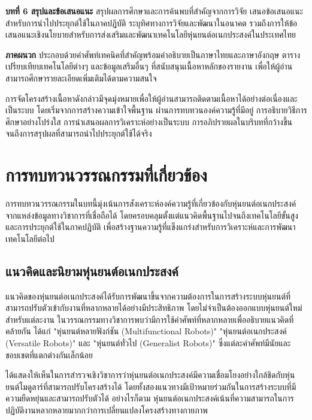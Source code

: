 \documentclass[a4paper]{article}
\begin{document}
\textbf{บทที่ 6 สรุปและข้อเสนอแนะ} สรุปผลการศึกษาและการค้นพบที่สำคัญจากการวิจัย เสนอข้อเสนอแนะสำหรับการนำไปประยุกต์ใช้ในภาคปฏิบัติ ระบุทิศทางการวิจัยและพัฒนาในอนาคต รวมถึงการให้ข้อเสนอแนะเชิงนโยบายสำหรับการส่งเสริมและพัฒนาเทคโนโลยีหุ่นยนต์อเนกประสงค์ในประเทศไทย

\textbf{ภาคผนวก} ประกอบด้วยคำศัพท์เทคนิคที่สำคัญพร้อมคำอธิบายเป็นภาษาไทยและภาษาอังกฤษ ตารางเปรียบเทียบเทคโนโลยีต่างๆ และข้อมูลเสริมอื่นๆ ที่สนับสนุนเนื้อหาหลักของรายงาน เพื่อให้ผู้อ่านสามารถศึกษารายละเอียดเพิ่มเติมได้ตามความสนใจ

การจัดโครงสร้างเนื้อหาดังกล่าวมีจุดมุ่งหมายเพื่อให้ผู้อ่านสามารถติดตามเนื้อหาได้อย่างต่อเนื่องและเป็นระบบ โดยเริ่มจากการสร้างความเข้าใจพื้นฐาน ผ่านการทบทวนองค์ความรู้ที่มีอยู่ การอธิบายวิธีการศึกษาอย่างโปร่งใส การนำเสนอผลการวิเคราะห์อย่างเป็นระบบ การอภิปรายผลในบริบทที่กว้างขึ้น จนถึงการสรุปผลที่สามารถนำไปประยุกต์ใช้ได้จริง
\newpage
\section{การทบทวนวรรณกรรมที่เกี่ยวข้อง}
การทบทวนวรรณกรรมในบทนี้มุ่งเน้นการสังเคราะห์องค์ความรู้ที่เกี่ยวข้องกับหุ่นยนต์อเนกประสงค์จากแหล่งข้อมูลทางวิชาการที่เชื่อถือได้ โดยครอบคลุมตั้งแต่แนวคิดพื้นฐานไปจนถึงเทคโนโลยีขั้นสูงและการประยุกต์ใช้ในภาคปฏิบัติ เพื่อสร้างฐานความรู้ที่แข็งแกร่งสำหรับการวิเคราะห์และการพัฒนาเทคโนโลยีต่อไป

\subsection{แนวคิดและนิยามหุ่นยนต์อเนกประสงค์}

แนวคิดของหุ่นยนต์อเนกประสงค์ได้รับการพัฒนาขึ้นจากความต้องการในการสร้างระบบหุ่นยนต์ที่สามารถปรับตัวเข้ากับงานที่หลากหลายได้อย่างมีประสิทธิภาพ โดยไม่จำเป็นต้องออกแบบหุ่นยนต์ใหม่สำหรับแต่ละงาน \parencite{liang2025decoding} ในวรรณกรรมทางวิชาการพบว่ามีการใช้คำศัพท์ที่หลากหลายเพื่ออธิบายแนวคิดที่คล้ายกัน ได้แก่ "หุ่นยนต์หลายฟังก์ชัน (Multifunctional Robots)" "หุ่นยนต์อเนกประสงค์ (Versatile Robots)" และ "หุ่นยนต์ทั่วไป (Generalist Robots)" ซึ่งแต่ละคำศัพท์มีนัยและขอบเขตที่แตกต่างกันเล็กน้อย

\textcite{bi2016survey} ได้แสดงให้เห็นในการสำรวจเชิงวิชาการว่าหุ่นยนต์อเนกประสงค์มีความเชื่อมโยงอย่างใกล้ชิดกับหุ่นยนต์โมดูลาร์ที่สามารถปรับโครงสร้างได้ โดยทั้งสองแนวทางมีเป้าหมายร่วมกันในการสร้างระบบที่มีความยืดหยุ่นและสามารถปรับตัวได้ อย่างไรก็ตาม หุ่นยนต์อเนกประสงค์เน้นที่ความสามารถในการปฏิบัติงานหลากหลายมากกว่าการเปลี่ยนแปลงโครงสร้างทางกายภาพ
\end{document}
